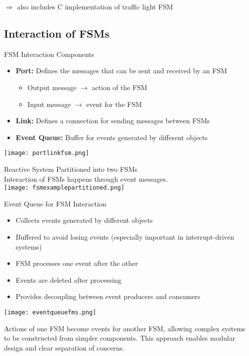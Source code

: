 $\Rightarrow$ also includes C implementation of traffic light FSM



\subsection{Interaction of FSMs}

\begin{definition}{FSM Interaction Components}
\begin{itemize}
    \item \textbf{Port:} Defines the messages that can be sent and received by an FSM
        \begin{itemize}
            \item Output message $\rightarrow$ action of the FSM
            \item Input message $\rightarrow$ event for the FSM
        \end{itemize}
    \item \textbf{Link:} Defines a connection for sending messages between FSMs
    \item \textbf{Event Queue:} Buffer for events generated by different objects
\end{itemize}
\texttt{[image: portlinkfsm.png]}
\end{definition}

\begin{example2}{Reactive System Partitioned into two FSMs}\\
    Interaction of FSMs happens through event messages.\\
\texttt{[image: fsmexamplepartitioned.png]}
\end{example2}

\begin{concept}{Event Queue for FSM Interaction}
\begin{itemize}
    \item Collects events generated by different objects
    \item Buffered to avoid losing events (especially important in interrupt-driven systems)
    \item FSM processes one event after the other
    \item Events are deleted after processing
    \item Provides decoupling between event producers and consumers
\end{itemize}
\texttt{[image: eventqueuefms.png]}

Actions of one FSM become events for another FSM, allowing complex systems to be constructed from simpler components. This approach enables modular design and clear separation of concerns.
\end{concept}




